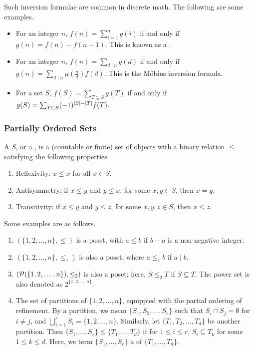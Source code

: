 Such inversion formulae are common in discrete math. The following are some examples.
\begin{example}
    \begin{itemize}
        \item For an integer $n$, $f(n) = \sum_{i=1}^{n} g(i)$ if and only if $g(n) = f(n) - f(n-1)$. This is known as a .
        \item For an integer $n$, $f(n) = \sum_{d \mid n} g(d)$ if and only if $g(n) = \sum_{d \mid n} \mu \left( \frac{n}{d} \right) f(d)$. This is the M\"obius inversion formula.
        \item For a set $S$, $f(S) = \sum_{T \subseteq S} g(T)$ if and only if $g(S) = \sum_{T \subseteq S} (-1)^{\left| S \right|-\left| T \right|} f(T)$.
    \end{itemize}
\end{example}

\subsubsection{Partially Ordered Sets}
\begin{definition}
    A  $S$, or a , is a (countable or finite) set of objects with a binary relation $\leq$ satisfying the following properties.
    \begin{enumerate}
        \item Reflexivity: $x \leq x$ for all $x \in S$.
        \item Antisymmetry: if $x \leq y$ and $y \leq x$, for some $x,y \in S$, then $x = y$.
        \item Transitivity: if $x \leq y$ and $y \leq z$, for some $x,y,z \in S$, then $x \leq z$.
    \end{enumerate}
\end{definition}

Some examples are as follows.

\begin{example}
    \begin{enumerate}
        \item $(\{1,2,\ldots,n\},\leq)$ is a poset, with $a \leq b$ if $b - a$ is a non-negative integer.
        \item $(\{1,2,\ldots,n\},\leq_{1})$ is also a poset, where $a \leq_{1} b$ if $a \mid b$.
        \item $(\mathcal{P}(\{1,2,\ldots,n\}), \leq_{2})$ is also a poset; here, $S \leq_{2} T$ if $S \subseteq T$. The power set is also denoted as $2^{\{1,2,\ldots,n\}}$.
        \item The set of partitions of $\{1,2,\ldots,n\}$, equippied with the partial ordering of refinement. By a partition, we mean $\{S_{1},S_{2},\ldots,S_{r}\}$ such that $S_{i} \cap S_{j} = \emptyset$ for $i \neq j$, and $\bigcup_{i = 1}^{r} S_{i} = \{1,2,\ldots,n\}$. Similarly, let $\{T_{1},T_{2},\ldots,T_{d}\}$ be another partition. Then $\{S_{1},\ldots,S_{r}\} \leq \{T_{1},\ldots,T_{d}\}$ if for $1 \leq i \leq r$, $S_{i} \subseteq T_{k}$ for some $1 \leq k \leq d$. Here, we term $\{S_{1},\ldots,S_{r}\}$ a  of $\{T_{1},\ldots,T_{d}\}$.
    \end{enumerate}
\end{example}

